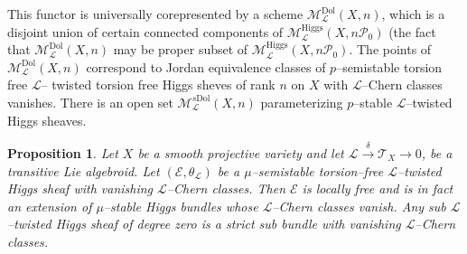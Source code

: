 \documentclass[12pt,reqno]{amsart}
\numberwithin{equation}{subsection}
\newtheorem{proposition}[equation]{Proposition}
\theoremstyle{definition}
\theoremstyle{theorem}
\begin{document}
This functor is universally corepresented by a scheme
$\mathcal{M}^{\mathrm{Dol}}_{\mathcal{L}}(X,n)$, which is a disjoint union
of certain connected components of
$\mathcal{M}^{\mathrm{Higgs}}_{\mathcal{L}}(X,n\mathcal{P}_{0})$ (the fact that $\mathcal{M}^{\text{Dol}}_{\mathcal{L}}(X,n)$ may be proper subset of $\mathcal{M}^{\text{Higgs}}_{\mathcal{L}}(X,n\mathcal{P}_{0})$. The points of $\mathcal{M}^{\mathrm{Dol}}_{\mathcal{L}}(X,n)$ correspond to Jordan equivalence classes of $p$--semistable torsion free $\mathcal{L}$-- twisted torsion free Higgs sheves of rank $n$ on $X$ with $\mathcal{L}$--Chern classes vanishes. There is an open set $\mathcal{M}^{s\text{Dol}}_{\mathcal{L}}(X,n)$ parameterizing $p$--stable $\mathcal{L}$--twisted Higgs sheaves.



\begin{proposition}\label{prop:locally-free-L-Higgs}
	Let $X$ be a smooth projective variety and let $
	\mathcal L 
	\xrightarrow{\ \delta\ } \mathcal{T}_X \longrightarrow 0$,
	be a transitive Lie algebroid. Let $(\mathcal{E},\theta_{\mathcal L})$ be a $\mu$--semistable
	torsion--free $\mathcal L$--twisted Higgs sheaf with vanishing
	$\mathcal L$--Chern classes. Then $\mathcal{E}$ is locally free and is in fact an extension of $\mu$--stable Higgs bundles whose $\mathcal{L}$--Chern classes vanish. Any sub $\mathcal{L}$--twisted Higgs sheaf  of degree zero is a strict sub bundle with vanishing $\mathcal{L}$--Chern classes.
\end{proposition}
\end{document}
